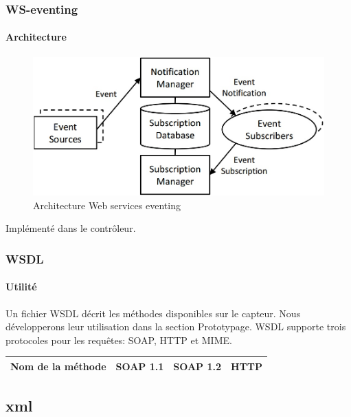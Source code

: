 \begin{frame}
 \frametitle{WS-eventing}
 \framesubtitle{Architecture}
 \begin{figure}
  \centering
  \includegraphics[scale=0.5]{figures/eventing.jpg}
  \caption{Architecture Web services eventing}
 \end{figure}
 Implémenté dans le contrôleur.
\end{frame}
\begin{frame}
 \frametitle{WSDL}
 \framesubtitle{Utilité}
 Un fichier WSDL décrit les méthodes disponibles sur le capteur. Nous développerons leur utilisation dans la section Prototypage.
 WSDL supporte trois protocoles pour les requêtes: SOAP, HTTP et MIME.\\
 \begin{tabular}{|c|c|c|c|}
 \hline
 Nom de la méthode & SOAP 1.1 & SOAP 1.2 & HTTP\\
 \hline
 
 \end{tabular}
\end{frame}
\subsection{xml}

